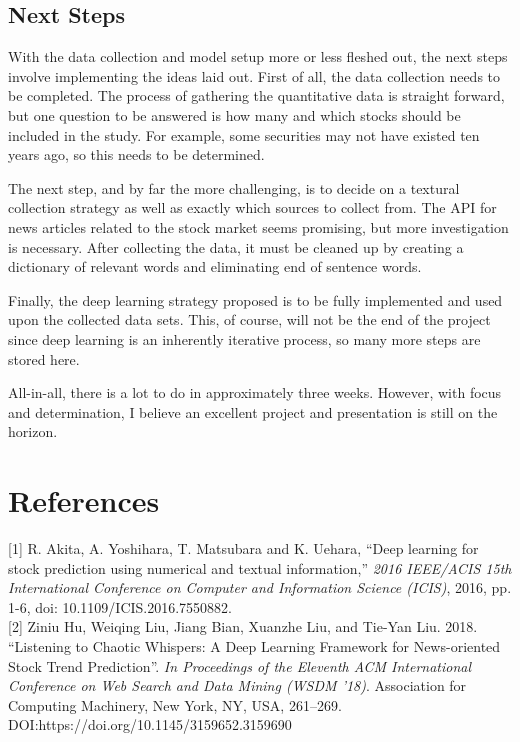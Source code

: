 \documentclass{article}
\begin{document}
\subsection*{Next Steps}
With the data collection and model setup more or less fleshed out, the next
steps involve implementing the ideas laid out. First of all, the data collection
needs to be completed. The process of gathering the quantitative data is
straight forward, but one question to be answered is how many and which stocks
should be included in the study. For example, some securities may not have
existed ten years ago, so this needs to be determined.

The next step, and by far the more challenging, is to decide on a textural
collection strategy as well as exactly which sources to collect from. The API
for news articles related to the stock market seems promising, but more
investigation is necessary. After collecting the data, it must be cleaned up by
creating a dictionary of relevant words and eliminating end of sentence words.

Finally, the deep learning strategy proposed is to be fully implemented and used
upon the collected data sets. This, of course, will not be the end of the
project since deep learning is an inherently iterative process, so many more
steps are stored here.

All-in-all, there is a lot to do in approximately three weeks. However, with
focus and determination, I believe an excellent project and presentation is
still on the horizon.

\section*{References}

\medskip
\small
[1] R. Akita, A. Yoshihara, T. Matsubara and K. Uehara, ``Deep learning for
stock prediction using numerical and textual information,'' \textit{2016 IEEE/ACIS 15th
International Conference on Computer and Information Science (ICIS)}, 2016, pp.
1-6, doi: 10.1109/ICIS.2016.7550882. \\

[2] Ziniu Hu, Weiqing Liu, Jiang Bian, Xuanzhe Liu, and Tie-Yan Liu. 2018.
``Listening to Chaotic Whispers: A Deep Learning Framework for News-oriented
Stock Trend Prediction''. \textit{In Proceedings of the Eleventh ACM
International Conference on Web Search and Data Mining (WSDM '18)}. Association for Computing Machinery, New York, NY, USA, 261–269. DOI:https://doi.org/10.1145/3159652.3159690
\end{document}
